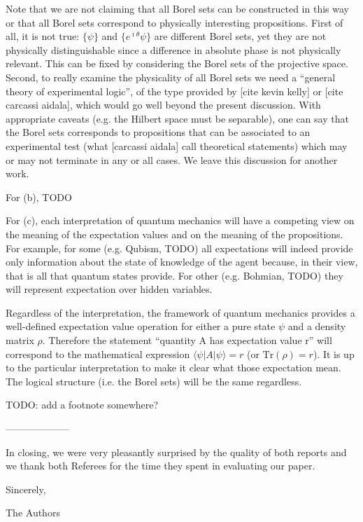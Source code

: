 \documentclass[11pt]{article}
\newcommand\change[1]{{\color{red!75!black} #1}}
\begin{document}
\change{Note that we are not claiming that all Borel sets can be constructed in this way or that all Borel sets correspond to physically interesting propositions. First of all, it is not true: $\{ \psi \}$ and $\{ e^{\imath \theta} \psi\}$ are different Borel sets, yet they are not physically distinguishable since a difference in absolute phase is not physically relevant. This can be fixed by considering the Borel sets of the projective space. Second, to really examine the physicality of all Borel sets we need a ``general theory of experimental logic'', of the type provided by [cite kevin kelly] or [cite carcassi aidala], which would go well beyond the present discussion. With appropriate caveats (e.g. the Hilbert space must be separable), one can say that the Borel sets corresponds to propositions that can be associated to an experimental test (what [carcassi aidala] call theoretical statements) which may or may not terminate in any or all cases. We leave this discussion for another work.}

For (b), TODO

For (c), each interpretation of quantum mechanics will have a competing view on the meaning of the expectation values and on the meaning of the propositions. For example, for some (e.g. Qubism, TODO) all expectations will indeed provide only information about the state of knowledge of the agent because, in their view, that is all that quantum states provide. For other (e.g. Bohmian, TODO) they will represent expectation over hidden variables.

Regardless of the interpretation, the framework of quantum mechanics provides a well-defined expectation value operation for either a  pure state $\psi$ and a density matrix $\rho$. Therefore the statement ``quantity A has expectation value r'' will correspond to the mathematical expression $\langle \psi | A | \psi \rangle = r$ (or $\text{Tr}(\rho) = r$). It is up to the particular interpretation to make it clear what those expectation mean. The logical structure (i.e. the Borel sets) will be the same regardless.

TODO: add a footnote somewhere?


--------------------


In closing, we were very pleasantly surprised by the quality of both
reports and we thank both Referees for the time they spent in
evaluating our paper.

Sincerely,

The Authors
\end{document}
